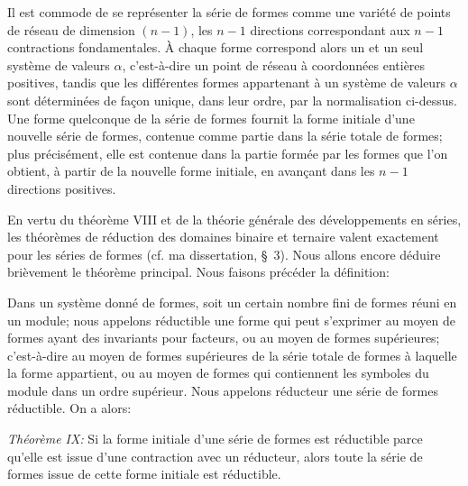 \documentclass[11pt]{article}
\begin{document}
Il est commode de se représenter la série de formes comme une variété de points de réseau de dimension $(n-1)$, les $n-1$ directions correspondant aux $n-1$ contractions fondamentales. À chaque forme correspond alors un et un seul système de valeurs $\alpha$, c'est-à-dire un point de réseau à coordonnées entières positives, tandis que les différentes formes appartenant à un système de valeurs $\alpha$ sont déterminées de façon unique, dans leur ordre, par la normalisation ci-dessus. Une forme quelconque de la série de formes fournit la forme initiale d'une nouvelle série de formes, contenue comme partie dans la série totale de formes; plus précisément, elle est contenue dans la partie formée par les formes que l'on obtient, à partir de la nouvelle forme initiale, en avançant dans les $n-1$ directions positives.

En vertu du théorème VIII et de la théorie générale des développements en séries, les théorèmes de réduction des domaines binaire et ternaire valent exactement pour les séries de formes (cf. ma dissertation, \S\ 3). Nous allons encore déduire brièvement le théorème principal. Nous faisons précéder la définition:

\og{} Dans un système donné de formes, soit un certain nombre fini de formes réuni en un module; nous appelons réductible une forme qui peut s'exprimer au moyen de formes ayant des invariants pour facteurs, ou au moyen de formes supérieures; c'est-à-dire au moyen de formes supérieures de la série totale de formes à laquelle la forme appartient, ou au moyen de formes qui contiennent les symboles du module dans un ordre supérieur. Nous appelons réducteur une série de formes réductible. \fg{} On a alors:

\emph{Théorème IX:} Si la forme initiale d'une série de formes est réductible parce qu'elle est issue d'une contraction avec un réducteur, alors toute la série de formes issue de cette forme initiale est réductible.
\end{document}
